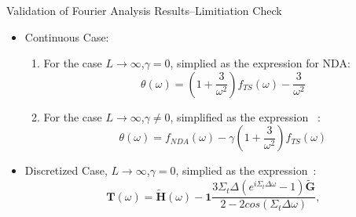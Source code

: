 \begin{frame}{Validation of Fourier Analysis Results--Limitiation Check}
\vspace{-1em}
\begin{itemize}
    \item Continuous Case:
\begin{enumerate}
    \item For the case $L\rightarrow\infty$,$\gamma=0$, simplied as the expression for NDA:
    \begin{equation}
         \theta(\omega)=(1+\frac{3}{\omega^2})f_{TS}(\omega)-\frac{3}{\omega^2}
    \end{equation}
    \item For the case $L\rightarrow\infty$,$\gamma\neq0$, simplified as the expression~ :
    \begin{equation}
         \theta(\omega)=f_{NDA}(\omega)-\gamma(1+\frac{3}{\omega^2})f_{TS}(\omega)
    \end{equation}
\end{enumerate} 
\item Discretized Case, $L\rightarrow\infty$,$\gamma=0$, simplied as the expression~:
\begin{equation}
    \mathbf{T}(\omega)=\tilde{\mathbf{H}}(\omega)-\mathbf{1}\frac{3\Sigma_t\Delta(e^{i\Sigma_t\Delta\omega}-1)\tilde{\mathbf{G}}}{2-2cos(\Sigma_t\Delta\omega)},
\end{equation}
\end{itemize}

\end{frame}

